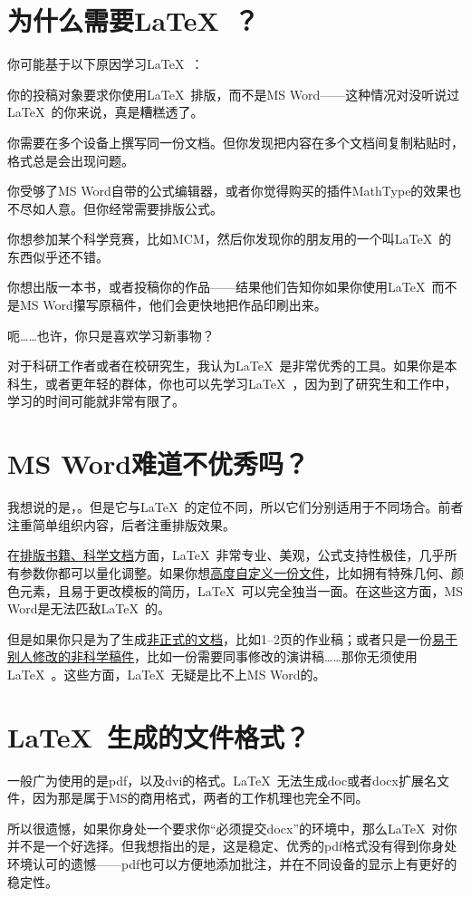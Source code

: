 \section{为什么需要\LaTeX\ ？}
你可能基于以下原因学习\LaTeX\ ：
\begin{feae}
\item 你的投稿对象要求你使用\LaTeX\ 排版，而不是MS Word——这种情况对没听说过\LaTeX\ 的你来说，真是糟糕透了。
\item 你需要在多个设备上撰写同一份文档。但你发现把内容在多个文档间复制粘贴时，格式总是会出现问题。
\item 你受够了MS Word自带的公式编辑器，或者你觉得购买的插件MathType的效果也不尽如人意。但你经常需要排版公式。
\item 你想参加某个科学竞赛，比如MCM，然后你发现你的朋友用的一个叫\LaTeX\ 的东西似乎还不错。
\item 你想出版一本书，或者投稿你的作品——结果他们告知你如果你使用\LaTeX\ 而不是MS Word攥写原稿件，他们会更快地把作品印刷出来。
\item 呃……也许，你只是喜欢学习新事物？
\end{feae}

对于科研工作者或者在校研究生，我认为\LaTeX\ 是非常优秀的工具。如果你是本科生，或者更年轻的群体，你也可以先学习\LaTeX\ ，因为到了研究生和工作中，学习的时间可能就非常有限了。

\section{MS Word难道不优秀吗？}
我想说的是，。但是它与\LaTeX\ 的定位不同，所以它们分别适用于不同场合。前者注重简单组织内容，后者注重排版效果。

在\uline{排版书籍、科学文档}方面，\LaTeX\ 非常专业、美观，公式支持性极佳，几乎所有参数你都可以量化调整。如果你想\uline{高度自定义一份文件}，比如拥有特殊几何、颜色元素，且易于更改模板的简历，\LaTeX\ 可以完全独当一面。在这些这方面，MS Word是无法匹敌\LaTeX\ 的。

但是如果你只是为了生成\uline{非正式的文档}，比如1--2页的作业稿；或者只是一份\uline{易于别人修改的非科学稿件}，比如一份需要同事修改的演讲稿……那你无须使用\LaTeX\ 。这些方面，\LaTeX\ 无疑是比不上MS Word的。

\section{\LaTeX\ 生成的文件格式？}
一般广为使用的是pdf，以及dvi的格式。\LaTeX\ 无法生成doc或者docx扩展名文件，因为那是属于MS的商用格式，两者的工作机理也完全不同。

所以很遗憾，如果你身处一个要求你“必须提交docx”的环境中，那么\LaTeX\ 对你并不是一个好选择。但我想指出的是，这是稳定、优秀的pdf格式没有得到你身处环境认可的遗憾——pdf也可以方便地添加批注，并在不同设备的显示上有更好的稳定性。